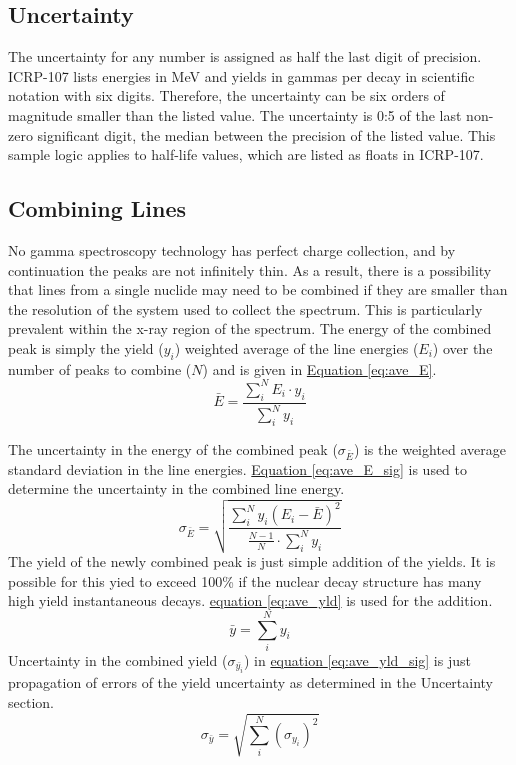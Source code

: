 \documentclass[12pt,report,justified]{SANDreport}
\begin{document}
\subsection{Uncertainty} \label{sec:unc}
The uncertainty for any number is assigned as half the last digit of precision. ICRP-107 lists
energies in MeV and yields in gammas per decay in scientific notation with six digits. Therefore,
the uncertainty can be six orders of magnitude smaller than the listed value. The uncertainty is 0:5
of the last non-zero significant digit, the median between the precision of the listed value. This
sample logic applies to half-life values, which are listed as floats in ICRP-107.

\subsection{Combining Lines} \label{sec:comb_lines}
No gamma spectroscopy technology has perfect charge collection, and by continuation the peaks
are not infinitely thin. As a result, there is a possibility that lines from a single nuclide may need
to be combined if they are smaller than the resolution of the system used to collect the spectrum.
This is particularly prevalent within the x-ray region of the spectrum. The energy of the combined
peak is simply the yield (\(y_i\)) weighted average of the line energies (\(E_i\)) over the number of peaks to
combine (\(N\)) and is given in \hyperref[eq:ave_E]{Equation \ref{eq:ave_E}}.
\begin{equation}
\bar{E} = \frac{\sum^{N}_{i} E_i \cdot y_i}{\sum^{N}_{i}y_i}
\label{eq:ave_E}
\end{equation}

The uncertainty in the energy of the combined peak (\( \sigma _{\bar{E}}\)) is the weighted average standard deviation
in the line energies. \hyperref[eq:ave_E_sig]{Equation \ref{eq:ave_E_sig}} is used to determine the uncertainty in the combined line energy.
\[
\sigma_{\bar{E}} = \sqrt{\frac{\sum^{N}_{i} y_i \left( E_i - \bar{E} \right) ^2}{ \frac{N-1}{N} \cdot \sum^{N}_{i} y_i}}
\label{eq:ave_E_sig}
\] 
The yield of the newly combined peak is just simple addition of the yields. It is possible for this
yied to exceed 100\% if the nuclear decay structure has many high yield instantaneous decays.
\hyperref[eq:ave_yld]{equation \ref{eq:ave_yld}} is used for the addition.
\[
\bar{y} = \sum^N_i y_i
\label{eq:ave_yld}
\] 
Uncertainty in the combined yield (\( \sigma _{\bar{y_i}} \)) in \hyperref[eq:ave_yld_sig]{equation \ref{eq:ave_yld_sig}} is just propagation of errors of the yield
uncertainty as determined in the Uncertainty section.
\[
\sigma_{\bar{y}} = \sqrt{\sum^N_i \left( \sigma_{y_i} \right) ^2}
\label{eq:ave_yld_sig}
\]
\end{document}

